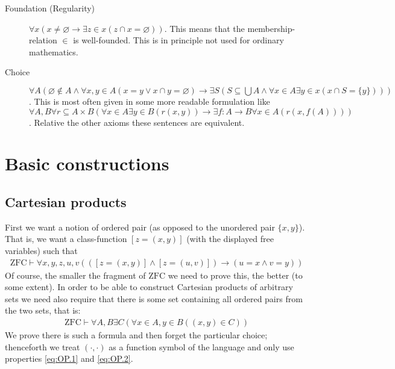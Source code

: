 \documentclass{scrartcl}
\theoremstyle{definition}
\theoremstyle{plain}
\theoremstyle{remark}
\newcommand{\ZFC}{\ensuremath{\mathrm{ZFC}}}
\newcommand{\limp}{\rightarrow}
\begin{document}
\begin{description}
\item[Foundation (Regularity)] $\forall x (x \not= \varnothing \limp \exists z \in x (z \cap x = \varnothing))$. This means that the membership-relation $\in$ is well-founded. This is in principle not used for ordinary mathematics.
\item[Choice] $\forall A (\varnothing \not\in A \land \forall x, y \in A (x = y \lor x \cap y = \varnothing) \limp \exists S (S \subseteq \bigcup A \land \forall x \in A \exists y \in x (x \cap S = \{y\})))$. This is most often given in some more readable formulation like $\forall A, B \forall r \subseteq A \times B (\forall x \in A \exists y \in B (r(x,y)) \limp \exists f : A \longrightarrow B \forall x \in A (r(x,f(A))))$. Relative the other axioms these sentences are equivalent.
\end{description}

\section{Basic constructions}
\label{sec:basic}

\subsection{Cartesian products}
\label{subsec:prod}

First we want a notion of ordered pair (as opposed to the unordered pair $\{x,y\}$). That is, we want a class-function $[z = (x,y)]$ (with the displayed free variables) such that
\begin{align}
  \ZFC \vdash \forall x, y, z, u, v (([z = (x,y)] \land [z = (u,v)]) \limp (u = x \land v = y))\label{eq:OP.1}
\end{align}
Of course, the smaller the fragment of $\ZFC$ we need to prove this, the better (to some extent). In order to be able to construct Cartesian products of arbitrary sets we need also require that there is some set containing all ordered pairs from the two sets, that is:
\begin{align}
  \ZFC \vdash \forall A, B \exists C (\forall x \in A, y \in B ((x,y) \in C))\label{eq:OP.2}
\end{align}
We prove there is such a formula and then forget the particular choice; thenceforth we treat $(\cdot,\cdot)$ as a function symbol of the language and only use properties \eqref{eq:OP.1} and \eqref{eq:OP.2}.
\end{document}
